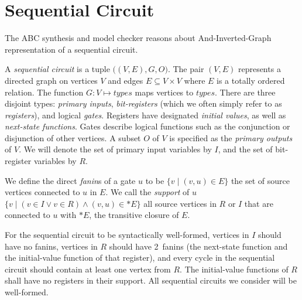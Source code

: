 \section{Sequential Circuit}
\label{sec:sequential}

The ABC synthesis and model checker reasons about And-Inverted-Graph 
representation of a sequential circuit.

\begin{definition}
\rm A {\em sequential circuit} is a tuple $\big( (V, E),G,
O\big)$.  The pair $(V,E)$ represents a directed graph on
vertices $V$ and edges $E \subseteq V\times V$ where $E$
is a totally ordered relation.  The function $G: V \mapsto
{\mathit types}$ maps vertices to ${\mathit types}$.
There are three disjoint types: {\em primary inputs}, {\em
bit-registers} (which we often simply refer to as {\em
registers}), and logical {\em gates}.  Registers have designated
{\em initial values}, as well as {\em next-state
functions}.  Gates describe logical functions such as
the conjunction or disjunction of other vertices. 
A subset $O$ of $V$ is specified as the {\em
primary outputs} of $V$.  
We will denote the set of primary input variables by $I$,
and the set of bit-register variables by $R$.  
\label{def:back:seq_circuit}
\end{definition}

\begin{definition}[Fanins]
\rm We define the direct {\em fanin}s of a gate $u$ to be
$\{v \mid (v,u)\in E\}$ the set of source vertices connected
to $u$ in $E$.  We call the {\em support} of $u$ $\{v \mid
(v\in I \vee v \in R) \wedge (v,u) \in \ast E\}$ all
source vertices in $R$ or $I$ that are connected to $u$
with $\ast E$, the transitive closure of $E$.
\label{def:back:fanins} 
\end{definition}


For the sequential
circuit to be syntactically well-formed, vertices in $I$
should have no fanins, vertices in $R$ should have
2~fanins (the next-state function and the initial-value
function of that register), %
and every cycle in the sequential circuit should contain
at least one vertex from $R$.  The initial-value functions
of $R$ shall have no registers in their support.  All
sequential circuits we consider will be well-formed.  

